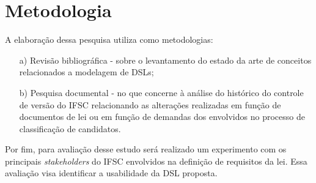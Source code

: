 \chapter{Metodologia}
\label{metodologia}

A elaboração dessa pesquisa utiliza como metodologias:

\begin{enumerate}
    \item[a)] Revisão bibliográfica - sobre o levantamento do estado da arte de conceitos relacionados a modelagem de \gls{DSL}s;
    
    \item[b)] Pesquisa documental - no que concerne à análise do histórico do controle de versão do \gls{IFSC} relacionando as alterações realizadas em função de documentos de lei ou em função de demandas dos envolvidos no processo de classificação de candidatos.
    
\end{enumerate}

Por fim, para avaliação desse estudo será realizado um experimento com os principais \textit{stakeholders} do IFSC envolvidos na definição de requisitos da lei. Essa avaliação visa identificar a usabilidade da \gls{DSL} proposta.

 
 
 
 
 
 
